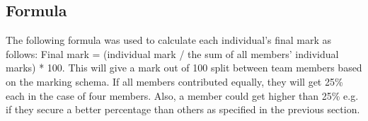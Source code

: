 \documentclass{article}
\begin{document}
\begin{appendices}
\subsection{Formula}
The following formula was used to calculate each individual’s final mark as follows: \newline
Final mark = (individual mark / the sum of all members’ individual marks) * 100. This will give a mark out of 100 split between team members based on the marking schema. 
If all members contributed equally, they will get 25\%{} each in the case of four members. 
Also, a member could get higher than 25\%{} e.g. if they secure a better percentage than others as specified in the previous section. 


\end{appendices}
\end{document}
